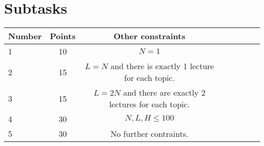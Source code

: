 \section*{Subtasks}
\begin{center}
\begin{tabular}{l*{6}{c}r}
    Number & Points & Other constraints\\
    \hline
    1 & 10 & $N = 1$\\
    2 & 15 & $L=N$ and there is exactly 1 lecture for each topic. \\
    3 & 15 & $L=2N$ and there are exactly 2 lectures for each topic. \\
    4 & 30 & $N, L, H \le 100$\\
    5 & 30 & No further contraints.
\end{tabular}
\end{center}
